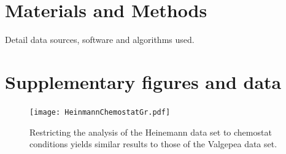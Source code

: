 \documentclass[notitlepage]{article}
\begin{document}
\section{Materials and Methods}
Detail data sources, software and algorithms used.

\section{Supplementary figures and data}
\begin{figure}[h]
\centering
\texttt{[image: HeinmannChemostatGr.pdf]}
\caption{
  Restricting the analysis of the Heinemann data set to chemostat conditions yields similar results to those of the Valgepea data set.
}
\label{fig:growthcorrchemo}
\end{figure}

\printbibliography
\end{document}
